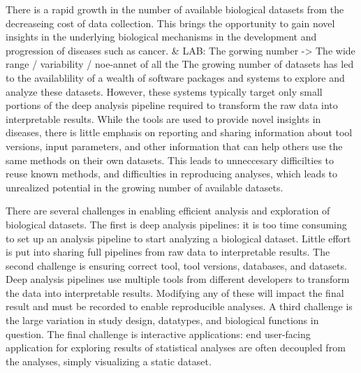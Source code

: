 There is a rapid growth in the number of available biological datasets from the
decreaseing cost of data collection. 
This brings the opportunity to gain novel
insights in the underlying biological mechanisms in the development and
progression of diseases such as cancer. 
& LAB: The gorwing number -> The wide range / variability / noe-annet of all the 
The growing number of datasets has led
to the availablility of a wealth of software packages and systems to explore and
analyze these datasets. 
However, these systems typically target only small
portions of the deep analysis pipeline required to transform the raw data into
interpretable results. While the tools are used to provide novel insights in
diseases, there is little emphasis on reporting and sharing information about
tool versions, input parameters, and other information that can help others use
the same methods on their own datasets. This leads to unneccesary difficilties
to reuse known methods, and difficulties in reproducing analyses, which leads
to unrealized potential in the growing number of available datasets. 


There are several challenges in enabling 
efficient analysis and exploration of
biological datasets. 
The first is deep analysis pipelines: it is too time consuming to set up 
an
analysis pipeline to start analyzing a biological dataset. 
Little effort is put
into sharing full pipelines from raw data to interpretable results.
The second challenge is ensuring correct tool, tool versions, databases, and
datasets. Deep analysis pipelines use multiple tools from different developers
to transform the data into interpretable results. Modifying any of these will
impact the final result and must be recorded to enable reproducible analyses. 
A third challenge is the large variation in study design, datatypes,
and biological functions in question.
The final challenge is interactive applications: end user-facing application
for exploring results of statistical analyses are often decoupled from the
analyses, simply visualizing a static dataset.  

